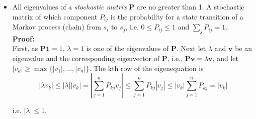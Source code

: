 \documentclass[10pt,b5paper,titlepage]{book}
\begin{document}
\begin{itemize}
\item All eigenvalues of a \textit{stochastic matrix} $\mathbf{P}$ are no greater than 1. A stochastic matrix of which component $P_{ij}$ is the probability for a state transition of a Markov process (chain) from $s_{i}$ to $s_{j}$, i.e. $0 \leq P_{ij} \leq 1$ and $\sum_{j}P_{ij} = 1$.\\

\textbf{Proof: }\\

First, as $\mathbf{P1} = 1$, $\lambda = 1$ is one of the eigenvalues of $\mathbf{P}$. Next let $\lambda$ and $\mathbf{v}$ be an eigenvalue and the corresponding eigenvector of $\mathbf{P}$, i.e., $\mathbf{P} \mathbf{v} = \lambda \mathbf{v}$, and let $|v_{k}| \ge \max\{|v_{1}|, \dots, |v_{n}|\}$. The kth row of the eigenequation is
\begin{equation}
|\lambda v_{k}| \leq |\lambda| |v_{k}| = \left\lvert{\sum_{j=1}^{n}P_{kj}v_{j}}\right\rvert \leq \sum_{j=1}^{n} P_{kj} |v_{j}| \leq  |v_{k}| \sum_{j=1}^{n} P_{kj} = |v_{k}|
\end{equation}

i.e. $|\lambda| \leq 1$.
\end{itemize}
\end{document}
